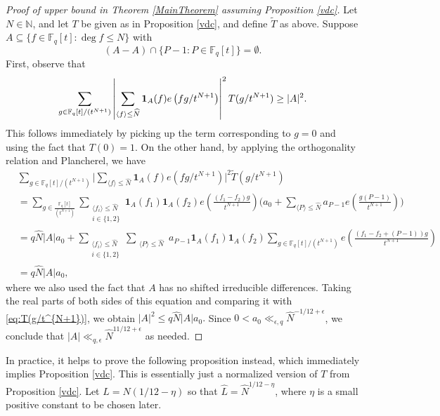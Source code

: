 \documentclass{article}
\theoremstyle{definition}
\theoremstyle{definition}
\theoremstyle{remark}
\newcommand{\N}{\mathbb{N}}
\newcommand{\F}{\mathbb{F}_q[t]}
\newcommand{\1}{\mathbf{1}}
\numberwithin{equation}{section}
\begin{document}
\begin{proof}[Proof of upper bound in Theorem \ref{MainTheorem} assuming Proposition \ref{vdc}]

Let $N\in \N$, and let $T$ be given as in Proposition \ref{vdc}, and define $\widetilde{T}$ as above. Suppose $A\subseteq\{f\in \F: \deg f \leq N\}$ with 
\[(A-A)\cap \{P-1: P\in\F\}=\emptyset.\]
First, observe that
\begin{equation}\label{eq:T(g/t^{N+1})}
\sum_{g\in \F\slash (t^{N+1})}\left|\sum_{\langle f \rangle \leq \widehat{N}}\1_A(f)e\left(fg\slash t^{N+1}\right)\right|^2T(g\slash t^{N+1})\geq |A|^2.    
\end{equation}
This follows immediately by picking up the term corresponding to $g=0$ and using the fact that $T(0)=1$. On the other hand, by applying the orthogonality relation and Plancherel, we have 
\begin{align*}
&\sum_{g\in \F\slash (t^{N+1})}\Bigg|\sum_{\langle f \rangle \leq \widehat{N}}\1_A(f)e\left(fg/ t^{N+1}\right)\Bigg|^2\widetilde{T}(g/ t^{N+1})
\\
&=\sum_{g\in \frac{\F}{\left(t^{N+1}\right)}}\sum_{\substack{\langle f_i\rangle \leq \widehat{N}\\i\in\{1,2\}}}\1_A(f_1)\1_A(f_2)e\left(\frac{(f_1-f_2)g}{t^{N+1}}\right)\Bigg(a_0+\sum_{\langle P\rangle \leq \widehat{N}}a_{P-1}e\left(\frac{g(P-1)}{t^{N+1}}\right)\Bigg)\\
&=q\widehat{N}|A|a_0+\sum_{\substack{\langle f_i\rangle \leq \widehat{N}\\i\in\{1,2\}}}\sum_{
\substack{\langle P\rangle \leq \widehat{N}}}a_{P-1}\1_A(f_1)\1_A(f_2)\sum_{g\in \F/ (t^{N+1})}e\left(\frac{(f_1-f_2+(P-1))g}{t^{N+1}}\right)\\
&=q\widehat{N}|A|a_0,
\end{align*}
where we also used the fact that $A$ has no shifted irreducible differences. Taking the real parts of both sides of this equation and comparing it with \eqref{eq:T(g/t^{N+1})}, we obtain
$|A|^2\leq q\widehat{N}|A|a_0.$
Since $0<a_0 \ll_{\epsilon,q} \widehat{N}^{-1/12+\epsilon}$, we conclude that 
$|A|\ll_{q,\epsilon} \widehat{N}^{11/12+\epsilon}$
as needed. 
\end{proof}

In practice, it helps to prove the following proposition instead, which immediately implies Proposition \ref{vdc}. This is essentially just a normalized version of $T$ from Proposition \ref{vdc}. Let $L=N(1\slash 12-\eta)$ so that $\widehat{L}=\widehat{N}^{1\slash 12-\eta}$, where $\eta$ is a small positive constant to be chosen later.
\end{document}
